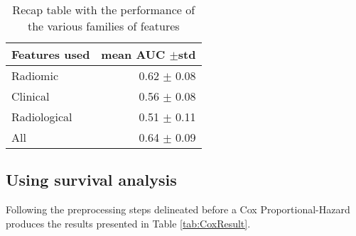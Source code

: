 \begin{table}
\caption{Recap table with the performance of the various families of features \label{tab:RecapicuRF}}
\centering
\begin{tabular}{l|r}
\toprule
Features used & mean AUC $\pm$std\\
\midrule
Radiomic  & 0.62 $\pm$ 0.08\\
Clinical  &  0.56 $\pm$ 0.08\\
Radiological & 0.51 $\pm$ 0.11\\
All & 0.64 $\pm$ 0.09\\
\bottomrule
\end{tabular}
\end{table}

\subsection{Using survival analysis}
Following the preprocessing steps delineated before a Cox Proportional-Hazard produces the results presented in Table \ref{tab:CoxResult}.

